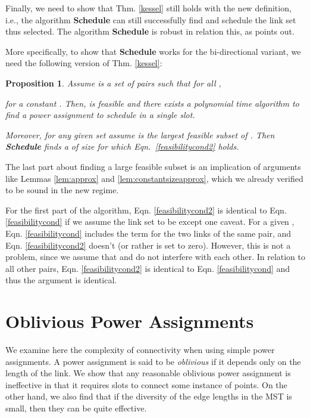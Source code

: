 \documentclass[11pt]{amsart}
\newtheorem{proposition}{Proposition}[section]
\begin{document}
Finally, we need to show that Thm. \ref{kessel} still holds with the new definition, i.e., the algorithm \textbf{Schedule} can still successfully find
and schedule the link set thus selected. The algorithm \textbf{Schedule} is robust in relation this, as \cite{KesselheimSoda11} points out. 

More specifically, to show that \textbf{Schedule} works for the bi-directional variant, we need the following version of 
Thm. \ref{kessel}:

\begin{proposition}
Assume  is a set of pairs such that for all ,

for a constant .
Then,  is feasible and there exists a polynomial time algorithm to find a power assignment to schedule  in a single slot.

Moreover, for any given set  assume  is the largest feasible subset of . Then \textbf{Schedule} finds a  of size  for which Eqn.~\ref{feasibilitycond2} holds.
\label{kessel2}
\end{proposition}


The last part about finding a large feasible subset is an implication of arguments like Lemmas \ref{lem:approx} and \ref{lem:constantsizeapprox}, which we already verified to be sound in the new regime.

For the first part of the algorithm, Eqn. \ref{feasibilitycond2} is
identical to Eqn. \ref{feasibilitycond} if we assume the link set to
be  except one caveat. For a
given , Eqn. \ref{feasibilitycond} includes the term
 for the two links of the same pair, and
Eqn. \ref{feasibilitycond2} doesn't (or rather  is
set to zero). However, this is not a problem, since we assume that
 and  do not interfere with each other. In relation to
all other pairs, Eqn. \ref{feasibilitycond2} is identical to
Eqn. \ref{feasibilitycond} and thus the argument is identical.  



\section{Oblivious Power Assignments}
\label{sec:oblivious}


We examine here the complexity of connectivity when using simple power
assignments. A power assignment is said
to be \emph{oblivious} if it depends only on the length of the link.
We show that any reasonable oblivious power assignment is ineffective
in that it requires  slots to connect some instance of  points.
On the other hand, we also find that if the diversity of the edge lengths in the MST is
small, then they can be quite effective. 
\end{document}

